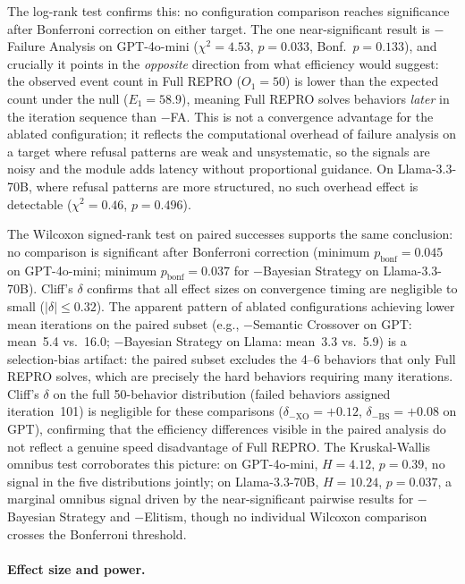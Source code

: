 The log-rank test confirms this: no configuration comparison reaches
significance after Bonferroni correction on either target.
The one near-significant result is $-$Failure Analysis on GPT-4o-mini
($\chi^2{=}4.53$, $p{=}0.033$, Bonf.\ $p{=}0.133$), and crucially it
points in the \emph{opposite} direction from what efficiency would
suggest: the observed event count in Full REPRO ($O_1{=}50$) is lower
than the expected count under the null ($E_1{=}58.9$), meaning Full REPRO
solves behaviors \emph{later} in the iteration sequence than $-$FA.
This is not a convergence advantage for the ablated configuration; it
reflects the computational overhead of failure analysis on a target where
refusal patterns are weak and unsystematic, so the signals are noisy and
the module adds latency without proportional guidance.
On Llama-3.3-70B, where refusal patterns are more structured, no such
overhead effect is detectable ($\chi^2{=}0.46$, $p{=}0.496$).

The Wilcoxon signed-rank test on paired successes supports the same
conclusion: no comparison is significant after Bonferroni correction
(minimum $p_\text{bonf}{=}0.045$ on GPT-4o-mini;
minimum $p_\text{bonf}{=}0.037$ for $-$Bayesian Strategy on Llama-3.3-70B).
Cliff's $\delta$ confirms that all effect sizes on convergence timing are
negligible to small ($|\delta| \leq 0.32$).
The apparent pattern of ablated configurations achieving lower mean
iterations on the paired subset (e.g., $-$Semantic Crossover on GPT:
mean~5.4 vs.~16.0; $-$Bayesian Strategy on Llama: mean~3.3 vs.~5.9) is a
selection-bias artifact: the paired subset excludes the 4--6 behaviors that
only Full REPRO solves, which are precisely the hard behaviors requiring
many iterations.
Cliff's $\delta$ on the full 50-behavior distribution (failed behaviors
assigned iteration~101) is negligible for these comparisons
($\delta_{-\text{XO}} = {+}0.12$, $\delta_{-\text{BS}} = {+}0.08$
on GPT), confirming that the efficiency differences visible in the paired
analysis do not reflect a genuine speed disadvantage of Full REPRO.
The Kruskal-Wallis omnibus test corroborates this picture: on
GPT-4o-mini, $H{=}4.12$, $p{=}0.39$, no signal in the five distributions
jointly; on Llama-3.3-70B, $H{=}10.24$, $p{=}0.037$, a marginal omnibus
signal driven by the near-significant pairwise results for $-$Bayesian
Strategy and $-$Elitism, though no individual Wilcoxon comparison crosses
the Bonferroni threshold.

\paragraph{Effect size and power.}

